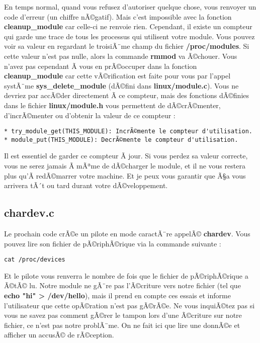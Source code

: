 \documentclass[11pt]{article}
\begin{document}
En temps normal, quand vous refusez d'autoriser quelque chose, vous renvoyer un code d'erreur (un chiffre nÃ©gatif). Mais c'est impossible avec la fonction \textbf{cleanup\_module} car celle-ci ne renvoie rien. Cependant, il existe un compteur qui garde une trace de tous les processus qui utilisent votre module. Vous pouvez voir sa valeur en regardant le troisiÃ¨me champ du fichier \textbf{/proc/modules}. Si cette valeur n'est pas nulle, alors la commande \textbf{rmmod} va Ã©chouer. Vous n'avez pas cependant Ã  vous en prÃ©occuper dans la fonction \textbf{cleanup\_module} car cette vÃ©rification est faite pour vous par l'appel systÃ¨me \textbf{sys\_delete\_module} (dÃ©fini dans \textbf{linux/module.c}). Vous ne devriez par accÃ©der directement Ã  ce compteur, mais des fonctions dÃ©finies dans le fichier \textbf{linux/module.h} vous permettent de dÃ©crÃ©menter, d'incrÃ©menter ou d'obtenir la valeur de ce compteur :

\begin{verbatim}
* try_module_get(THIS_MODULE): IncrÃ©mente le compteur d'utilisation.
* module_put(THIS_MODULE): DecrÃ©mente le compteur d'utilisation.
\end{verbatim}

Il est essentiel de garder ce compteur Ã  jour. Si vous perdez sa valeur correcte, vous ne serez jamais Ã  mÃªme de dÃ©charger le module, et il ne vous restera plus qu'Ã  redÃ©marrer votre machine. Et je peux vous garantir que Ã§a vous arrivera tÃ´t ou tard durant votre dÃ©veloppement.

\subsection*{chardev.c}
\label{sec-6-5}

Le prochain code crÃ©e un pilote en mode caractÃ¨re appelÃ© \textbf{chardev}.
Vous pouvez lire son fichier de pÃ©riphÃ©rique via la commande suivante :

\begin{verbatim}
cat /proc/devices
\end{verbatim}

Et le pilote vous renverra le nombre de fois que le fichier de pÃ©riphÃ©rique a Ã©tÃ© lu. Notre module ne gÃ¨re pas l'Ã©criture vers notre fichier (tel que \textbf{echo "hi" > /dev/hello}), mais il prend en compte ces essais et informe l'utilisateur que cette opÃ©ration n'est pas gÃ©rÃ©e. Ne vous inquiÃ©tez pas si vous ne savez pas comment gÃ©rer le tampon lors d'une Ã©criture sur notre fichier, ce n'est pas notre problÃ¨me. On ne fait ici que lire une donnÃ©e et afficher un accusÃ© de rÃ©ception.
\end{document}
